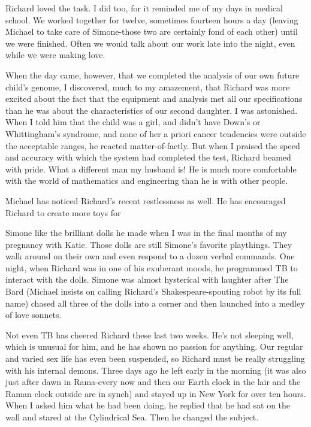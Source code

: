 \documentclass[]{article}
\begin{document}
Richard loved the task.  I did too, for it reminded me of my days in medical school.  We worked together for twelve, sometimes fourteen hours a day (leaving Michael to take care of Simone-those two are certainly fond of each other) until we were finished.  Often we would talk about our work late into the night, even while we were making love.

When the day came, however, that we completed the analysis of our own future child’s genome, I discovered, much to my amazement, that Richard was more excited about the fact that the equipment and analysis met all our specifications than he was about the characteristics of our second daughter.  I was astonished.  When I told him that the child was a girl, and didn’t have Down’s or Whittingham’s syndrome, and none of her a priori cancer tendencies were outside the acceptable ranges, he reacted matter-of-factly.  But when I praised the speed and accuracy with which the system had completed the test, Richard beamed with pride.  What a different man my husband is! He is much more comfortable with the world of mathematics and engineering than he is with other people.

Michael has noticed Richard’s recent restlessness as well.  He has encouraged Richard to create more toys for

Simone like the brilliant dolls he made when I was in the final months of my pregnancy with Katie.  Those dolls are still Simone’s favorite playthings.  They walk around on their own and even respond to a dozen verbal commands.  One night, when Richard was in one of his exuberant moods, he programmed TB to interact with the dolls.  Simone was almost hysterical with laughter after The Bard (Michael insists on calling Richard’s Shakespeare-spouting robot by its full name) chased all three of the dolls into a corner and then launched into a medley of love sonnets.

Not even TB has cheered Richard these last two weeks.  He’s not sleeping well, which is unusual for him, and he has shown no passion for anything.  Our regular and varied sex life has even been suspended, so Richard must be really struggling with his internal demons.  Three days ago he left early in the morning (it was also just after dawn in Rama-every now and then our Earth clock in the lair and the Raman clock outside are in synch) and stayed up in New York for over ten hours.  When I asked him what he had been doing, he replied that he had sat on the wall and stared at the Cylindrical Sea.  Then he changed the subject.
\end{document}

